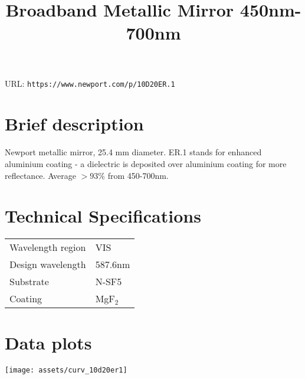 \documentclass{article}
\title{\vspace{-4cm}Broadband Metallic Mirror 450nm-700nm}
\date{}
\begin{document}
\maketitle

\vspace{-1cm}


URL: \texttt{https://www.newport.com/p/10D20ER.1}

\begin{multicols}{2}

\section{Brief description}


Newport metallic mirror, 25.4 mm diameter. ER.1 stands for enhanced aluminium coating - a dielectric is deposited over aluminium coating for more reflectance. Average $>93\%$ from 450-700nm.



\section{Technical Specifications}

\begin{tabular}{|l|l|}
Wavelength region & VIS \\
Design wavelength & 587.6nm \\
Substrate & N-SF5 \\
Coating & MgF$_{2}$ \\
\end{tabular}%

\section{Data plots}

\begin{center}
\texttt{[image: assets/curv\_10d20er1]}
\end{center}


\end{multicols}
%
\end{document}
